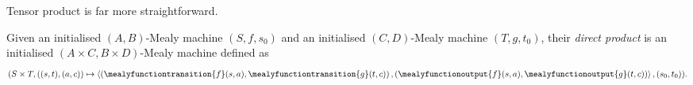 Tensor product is far more straightforward.

\begin{definition}
    Given an initialised \((A,B)\)-Mealy machine \((S,f,s_0)\) and an
    initialised \((C,D)\)-Mealy machine \((T,g,t_0)\), their
    \emph{direct product} is an initialised \((A \times C,B \times D)\)-Mealy
    machine defined as \[
        (S \times T, \left((s, t), (a, c)\right) \mapsto \left\langle
        \left(
        \mealyfunctiontransition{f}\mleft(s, a\mright),
        \mealyfunctiontransition{g}\mleft(t, c\mright)
        \right),
        \left(
        \mealyfunctionoutput{f}\mleft(s, a\mright),
        \mealyfunctionoutput{g}\mleft(t, c\mright)
        \right)\right\rangle,
        (s_0, t_0)
        ).
    \]
\end{definition}


